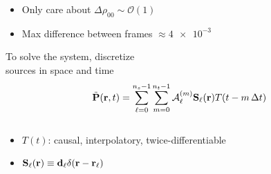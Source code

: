 \documentclass[12pt,usenames,dvipsnames]{beamer}
\begin{document}
\begin{frame}
  \centering
  
  \vspace{-0.6cm}
  \begin{itemize}
    \item Only care about $\Delta \rho_{00} \sim \mathcal{O}(1)$
    \item Max difference between frames $\approx \num{4e-3}$
  \end{itemize}

\end{frame}

\begin{frame}{To solve the system, discretize \\ sources in space and time}
	\begin{equation*}
    	\tilde{\vb{P}}(\vb{r}, t) = \sum_{\ell = 0}^{n_s - 1} \sum_{m = 0}^{n_t - 1} \mathcal{A}^{(m)}_\ell \vb{S}_\ell(\vb{r}) T(t - m \, \Delta t)
    \end{equation*}
    \begin{columns}
      \begin{column}{0.42\textwidth}
      	\begin{itemize}
          \item $T(t)$: causal, interpolatory, twice-differentiable
          \item $\vb{S}_\ell(\vb{r}) \equiv \vb{d}_\ell \delta(\vb{r} - \vb{r}_\ell)$
        \end{itemize}
      \end{column}
      \begin{column}{0.58\textwidth}
      	
      \end{column}
    \end{columns}
    \vspace{1.6cm}
\end{frame}
\end{document}
